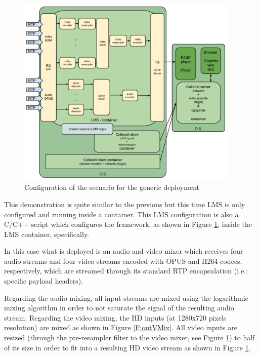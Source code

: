 \begin{figure}[htb]
\begin{center}
\includegraphics[width=0.95\textwidth]{./images/genericScenario.png}
\caption{Configuration of the scenario for the generic deployment}
\label{F:gdsc}
\end{center}
\end{figure}

This demonstration is quite similar to the previous but this time LMS is only configured and running inside a container. This LMS configuration is also a C/C++ script which configures the framework, as shown in Figure \ref{F:gdsc}, inside the LMS container, specifically.

In this case what is deployed is an audio and video mixer which receives four audio streams and four video streams encoded with OPUS and H264 codecs, respectively, which are streamed through its standard RTP encapsulation (i.e.: specific payload headers).

Regarding the audio mixing, all input streams are mixed using the logarithmic mixing algorithm in order to not saturate the signal of the resulting audio stream. Regarding the video mixing, the HD inputs (at 1280x720 pixels resolution) are mixed as shown in Figure \ref{F:outVMix}. All video inputs are resized (through the pre-resampler filter to the video mixer, see Figure \ref{F:gdsc}) to half of its size in order to fit into a resulting HD video stream as shown in Figure \ref{F:gdsc}.

